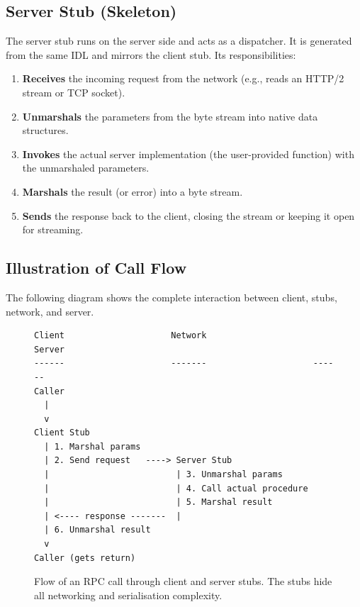\documentclass[a4paper]{article}
\begin{document}
\subsection{Server Stub (Skeleton)}
The server stub runs on the server side and acts as a dispatcher. It is generated from the same IDL and mirrors the client stub. Its responsibilities:

\begin{enumerate}
    \item \textbf{Receives} the incoming request from the network (e.g., reads an HTTP/2 stream or TCP socket).
    \item \textbf{Unmarshals} the parameters from the byte stream into native data structures.
    \item \textbf{Invokes} the actual server implementation (the user-provided function) with the unmarshaled parameters.
    \item \textbf{Marshals} the result (or error) into a byte stream.
    \item \textbf{Sends} the response back to the client, closing the stream or keeping it open for streaming.
\end{enumerate}

\subsection{Illustration of Call Flow}
The following diagram shows the complete interaction between client, stubs, network, and server.

\begin{figure}[H]
\centering
\begin{verbatim}
Client                     Network                     Server
------                     -------                     ------
Caller                     
  |                         
  v                         
Client Stub                 
  | 1. Marshal params       
  | 2. Send request   ----> Server Stub
  |                         | 3. Unmarshal params
  |                         | 4. Call actual procedure
  |                         | 5. Marshal result
  | <---- response -------  |
  | 6. Unmarshal result     
  v                         
Caller (gets return)        
\end{verbatim}
\caption{Flow of an RPC call through client and server stubs. The stubs hide all networking and serialisation complexity.}
\label{fig:stubflow}
\end{figure}
\end{document}
